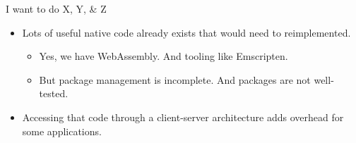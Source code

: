 \begin{frame}{I want to do X, Y, \& Z}
\begin{itemize}[<+->]
\tightlist
\item
  Lots of useful native code already exists that would need to
  reimplemented.

  \begin{itemize}[<+->]
  \tightlist
  \item
    Yes, we have WebAssembly. And tooling like Emscripten.
  \item
    But package management is incomplete. And packages are not
    well-tested.
  \end{itemize}

\item
  Accessing that code through a client-server architecture adds overhead
  for some applications.
\end{itemize}

\end{frame}

